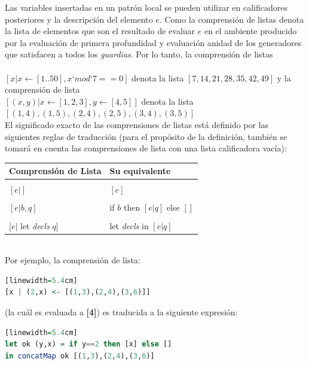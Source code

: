 \documentclass[10pt,journal,compsoc]{IEEEtran}
\begin{document}
Las variables insertadas en un patr\'on local  se pueden utilizar en calificadores posteriores y la descripci\'on del elemento $e$. Como la comprensi\'on de listas denota la lista de elementos que son el resultado de evaluar $e$ en el ambiente producido por la evaluaci\'on de primera profundidad y evaluaci\'on anidad de los generadores que satisfacen a  todos los \emph{guardias}. Por lo tanto, la comprensi\'on de listas \\ \\
\textbf{$[ x | x \leftarrow [1..50], x ‘mod‘ 7 == 0 ]$} denota la lista  $[7,14,21,28,35,42,49]$ y la comprensi\'on de lista \\
\textbf{$[ (x,y) | x\leftarrow [1,2,3], y\leftarrow[4,5] ]$} denota la lista $[(1,4),(1,5),(2,4),(2,5),(3,4),(3,5)] $ \\

El significado exacto de las comprensiones de listas est\'a definido por las siguientes reglas de traducci\'on (para el prop\'osito de la definici\'on, tambi\'en se tomar\'a en cuenta las comprensiones de lista con una lista calificadora vac\'ia): \\

\begin{tabular}{ l | l }
	\hline
	Comprensi\'on de Lista & Su equivalente \\
	\hline\\
	$[e |  ]$ &  $[e]$\\
	\hline\\
	$[e | b, q]$ & if $b$ then $[e | q]$ else $[]$ \\
	\hline\\
	$[e | $ let \emph{decls} $q]$ & let \emph{decls} in $[e | q]$\\
	\hline
\end{tabular} \\

Por ejemplo, la comprensi\'on de lista: \\
\begin{lstlisting}[language=Haskell, caption = {C\'odigo de una notaci\'on de comprensi\'on de lista}][linewidth=5.4cm]
[x | (2,x) <- [(1,3),(2,4),(3,6)]]
\end{lstlisting}
(la cu\'al es evaluada a \textbf{[4]}) es traducida a la siguiente expresi\'on: \\
\begin{lstlisting}[language=Haskell, caption = {Expresi\'on de una comprensi\'on de lista}][linewidth=5.4cm]
let ok (y,x) = if y==2 then [x] else [] 
in concatMap ok [(1,3),(2,4),(3,6)]
\end{lstlisting}
\end{document}
